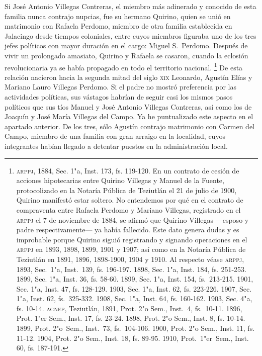 \documentclass[14pt,twoside,final]{extbook} %
\let\oldfootnote\footnote
\renewcommand\footnote[1]{%
\oldfootnote{\hspace{1mm}#1}}
\begin{document}
Si José Antonio Villegas Contreras, el miembro más adinerado y conocido de esta familia nunca contrajo nupcias, fue su hermano Quirino, quien se unió en matrimonio con Rafaela Perdomo, miembro de otra familia establecida en Jalacingo desde tiempos coloniales, entre cuyos miembros figuraba uno de los tres jefes políticos con mayor duración en el cargo: Miguel S.~Perdomo. Después de vivir un prolongado amasiato, Quirino y Rafaela se casaron, cuando la eclosión revolucionaria ya se había
propagado en todo el territorio nacional.\footnote{\textsc{arppj}, 1884, Sec. 1"a, Inst. 173, fs. 119-120. En un contrato de cesión de acciones hipotecarias entre Quirino Villegas y Manuel de la Fuente, protocolizado en la Notaría Pública de Teziutlán el 21 de julio de 1900, Quirino manifestó estar soltero. No entendemos por qué en el contrato de compraventa entre Rafaela Perdomo y Mariano Villegas, registrado en el \textsc{arppj} el 7 de noviembre de 1884, se afirmó que Quirino Villegas ---esposo y padre respectivamente--- ya había fallecido. Este dato genera dudas y es improbable porque Quirino siguió registrando y signando operaciones en el \textsc{arppj} en 1893, 1898, 1899, 1901 y 1907; así como en la Notaría Pública de Teziutlán en 1891, 1896, 1898-1900, 1904 y 1910. Al respecto véase \textsc{arppj}, 1893, Sec.~1"a, Inst.~139, fs. 196-197. 1898, Sec. 1"a, Inst. 184, fs. 251-253. 1899, Sec. 1"a, Inst. 36, fs. 58-60. 1899, Sec. 1"a, Inst. 154, fs.~213-215. 1901, Sec. 1"a, Inst. 47, fs. 128-129. 1903, Sec. 1"a, Inst. 62, fs. 223-226. 1907, Sec. 1"a, Inst. 62, fs.~325-332. 1908, Sec. 1"a, Inst. 64, fs. 160-162. 1903, Sec. 4"a, fs. 10-14. \textsc{agnep}, Teziutlán, 1891, Prot. 2"o Sem., Inst.~4, fs.~10-11. 1896, Prot. 1"er Sem., Inst. 17, fs. 23-24. 1898, Prot. 2"o Sem., Inst. 8, fs. 10-14. 1899, Prot. 2"o~Sem., Inst.~73, fs.~104-106. 1900, Prot. 2"o Sem., Inst. 11, fs. 11-12. 1904, Prot. 2"o Sem., Inst. 18, fs. 89-95. 1910, Prot.~1"er~Sem., Inst. 60, fs. 187-191.} De esta relación nacieron hacia la segunda mitad del siglo \textsc{xix} Leonardo, Agustín Elías y Mariano Lauro Villegas Perdomo. Si el padre no mostró preferencia por las actividades políticas, sus vástagos habrían de seguir casi los mismos pasos políticos que sus tíos Manuel y José Antonio Villegas Contreras, así como los de Joaquín y José María Villegas del Campo. Ya he puntualizado este aspecto en el apartado anterior. De los tres, sólo Agustín contrajo matrimonio con Carmen del Campo, miembro de una familia con gran arraigo en la localidad, cuyos integrantes habían llegado a detentar puestos en la administración local.
\end{document}
